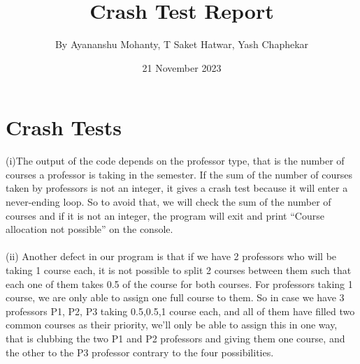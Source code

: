 \documentclass[a4paper,12pt]{article}
\title{\Large{\textbf {Crash Test Report}}}
\author{By  Ayananshu Mohanty, T Saket Hatwar, Yash Chaphekar}
\date{21 November 2023}
\begin{document}
\small
{}
\setcounter{page}{1}
\fancyhf{}
\renewcommand{\headrulewidth}{2pt}
\renewcommand{\footrulewidth}{1pt}

\maketitle

\section{Crash Tests}
(i)The output of the code depends on the professor type, that is the number of courses a professor is taking in the semester. If the sum of the number of courses taken by professors is not an integer, it gives a crash test because it will enter a never-ending loop. So to avoid that, we will check the sum of the number of courses and if it is not an integer, the program will exit and print “Course allocation not possible” on the console.\\ \\
(ii) Another defect in our program is that if we have 2 professors who will be taking 1 course each, it is not possible to split 2 courses between them such that each one of them takes 0.5 of the course for both courses. For professors taking 1 course, we are only able to assign one full course to them. So in case we have 3 professors P1, P2, P3 taking 0.5,0.5,1 course each, and all of them have filled two common courses as their priority, we’ll only be able to assign this in one way, that is clubbing the two P1 and P2 professors and giving them one course, and the other to the P3 professor contrary to the four possibilities. \\ \\
\end{document}
